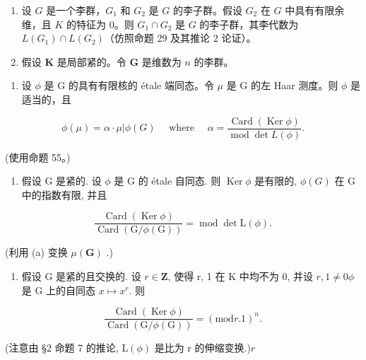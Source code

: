 
\begin{enumerate}
\def\labelenumi{\arabic{enumi}.}
\item
  设 \(G\) 是一个李群，\(G_1\) 和 \(G_2\) 是 \(G\) 的李子群。假设 \(G_2\) 在 \(G\) 中具有有限余维，且 \(K\) 的特征为 0。则 \(G_1 \cap G_2\) 是 \(G\) 的李子群，其李代数为 \(L(G_1) \cap L(G_2)\)（仿照命题 29 及其推论 2 论证）。
\item
  假设 \(\mathbf{K}\) 是局部紧的。令 \(\mathbf{G}\) 是维数为 \(n\) 的李群。
\end{enumerate}

\begin{enumerate}
\def\labelenumi{(\alph{enumi})}
\tightlist
\item
  设 \(\phi\) 是 G 的具有有限核的 étale 端同态。令 \(\mu\) 是 G 的左 Haar 测度。则 \(\phi\) 是适当的，且
\end{enumerate}

\[
\phi (\mu) = \alpha \cdot \mu | \phi (G) \quad \text { where } \quad \alpha = \frac {\operatorname{Card} (\operatorname{Ker} \phi)}{\operatorname{mod} \det L (\phi)}.
\]

(使用命题 55。)
\relax{}
\begin{enumerate}
\def\labelenumi{(\alph{enumi})}
\setcounter{enumi}{1}
\tightlist
\item
  假设 G 是紧的. 设 \(\phi\) 是 G 的 étale 自同态. 则 \(\operatorname{Ker} \phi\) 是有限的, \(\phi(G)\) 在 G 中的指数有限, 并且
\end{enumerate}

\[
\frac {\operatorname{Card} (\operatorname{Ker} \phi)}{\operatorname{Card} (\mathrm{G} / \phi (\mathrm{G}))} = \operatorname{mod} \det \mathrm{L} (\phi).
\]

(利用 (a) 变换 \(\mu (\mathbf{G})\) .)

\begin{enumerate}
\def\labelenumi{(\alph{enumi})}
\setcounter{enumi}{2}
\tightlist
\item
  假设 G 是紧的且交换的. 设 \(r \in \mathbf{Z}\), 使得 r, 1 在 K 中均不为 0, 并设 \(r, 1 \neq 0\)\(\phi\) 是 G 上的自同态 \(x \mapsto x^r\). 则
\end{enumerate}

\[
\frac {\operatorname{Card} (\operatorname{Ker} \phi)}{\operatorname{Card} (\mathrm{G} / \phi (\mathrm{G}))} = (\mathrm{mod} r. 1) ^ {n}.
\]

(注意由 §2 命题 7 的推论, \(\mathrm{L}(\phi)\) 是比为 r 的伸缩变换.)\(r\)

